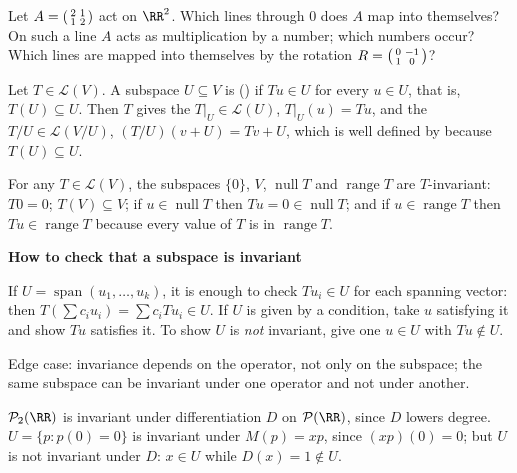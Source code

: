 \documentclass[10pt]{scrartcl}
\DeclareMathOperator{\spn}{span}\DeclareMathOperator{\nul}{null}\DeclareMathOperator{\range}{range}
\newcommand{\PP}{\mathcal P}\newcommand{\LL}{\mathcal L}\newcommand{\MM}{\mathcal M}\newcommand{\T}{\mathsf T}
\newenvironment{methodbox}[1]{\begin{mdframed}[style=methodstyle]\textbf{\color{NavyBlue}#1}\par\vspace{2pt}}{\end{mdframed}}
\begin{document}
\begin{qbox}
  Let $A=\begin{psmallmatrix}2&1\\1&2\end{psmallmatrix}$ act on $\RR^2$. Which lines through $0$ does $A$ map into themselves? On such a line $A$ acts as multiplication by a number; which numbers occur? Which lines are mapped into themselves by the rotation $R=\begin{psmallmatrix}0&-1\\1&0\end{psmallmatrix}$?
\end{qbox}

\begin{definition*}
  Let $T\in\LL(V)$. A subspace $U\subseteq V$ is  () if $Tu\in U$ for every $u\in U$, that is, $T(U)\subseteq U$. Then $T$ gives the  $T|_U\in\LL(U)$, $T|_U(u)=Tu$, and the  $T/U\in\LL(V/U)$, $(T/U)(v+U)=Tv+U$, which is well defined by  because $T(U)\subseteq U$.
\end{definition*}

\begin{example*}
  For any $T\in\LL(V)$, the subspaces $\{0\}$, $V$, $\nul T$ and $\range T$ are $T$-invariant: $T0=0$; $T(V)\subseteq V$; if $u\in\nul T$ then $Tu=0\in\nul T$; and if $u\in\range T$ then $Tu\in\range T$ because every value of $T$ is in $\range T$.
\end{example*}

\begin{methodbox}{How to check that a subspace is invariant}
  \begin{steps}
    \ii If $U=\spn(u_1,\dots,u_k)$, it is enough to check $Tu_i\in U$ for each spanning vector: then $T(\sum c_iu_i)=\sum c_iTu_i\in U$.
    \ii If $U$ is given by a condition, take $u$ satisfying it and show $Tu$ satisfies it.
    \ii To show $U$ is \emph{not} invariant, give one $u\in U$ with $Tu\notin U$.
  \end{steps}
  Edge case: invariance depends on the operator, not only on the subspace; the same subspace can be invariant under one operator and not under another.
\end{methodbox}

\begin{example*}
  $\PP_2(\RR)$ is invariant under differentiation $D$ on $\PP(\RR)$, since $D$ lowers degree. $U=\{p:p(0)=0\}$ is invariant under $M(p)=xp$, since $(xp)(0)=0$; but $U$ is not invariant under $D$: $x\in U$ while $D(x)=1\notin U$.
\end{example*}
\end{document}
